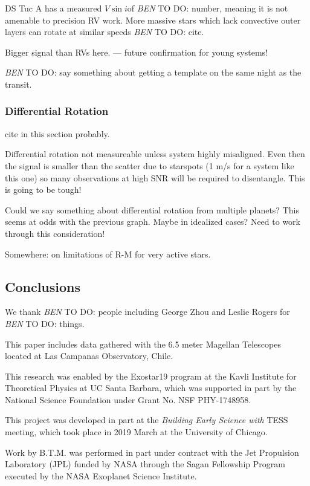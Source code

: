 \documentclass[twocolumn]{aastex63}
\newcommand{\vsini}{{$V \sin i$}}
\newcommand{\todo}[3]{{\color{#2} \emph{#1} TO DO: #3}}
\newcommand{\btmtodo}[1]{\todo{BEN}{blue}{#1}}
\begin{document}
DS Tuc A has a measured \vsini of \btmtodo{number}, meaning it is not amenable to precision RV work.
More massive stars which lack convective outer layers can rotate at similar speeds \btmtodo{cite}.

Bigger signal than RVs here. --- future confirmation for young systems!


\btmtodo{say something about getting a template on the same night as the transit.}

\subsubsection{Differential Rotation}



cite \citet{Giminez06} in this section probably.


Differential rotation not measureable unless system highly misaligned. Even then the signal is smaller than the scatter due to starspots (1 m/s for a system like this one) so many observations at high SNR will be required to disentangle. This is going to be tough!

Could we say something about differential rotation from multiple planets? This seems at odds with the previous graph. Maybe in idealized cases? Need to work through this consideration!


Somewhere: \citet{Oshagh18} on limitations of R-M for very active stars.


\subsection{Conclusions}



\acknowledgements

We thank \btmtodo{people including George Zhou and Leslie Rogers} for \btmtodo{things}.

This paper includes data gathered with the 6.5 meter Magellan Telescopes located at Las Campanas Observatory, Chile.


This research was enabled by the Exostar19 program at the Kavli Institute for Theoretical Physics at UC Santa Barbara, which was supported in part by the National Science Foundation under Grant No. NSF PHY-1748958.

This project was developed in part at the \textit{Building Early Science with} TESS meeting, which took place in 2019 March at the University of Chicago.

Work by B.T.M. was performed in part under contract with the Jet
Propulsion Laboratory (JPL) funded by NASA through
the Sagan Fellowship Program executed by the NASA
Exoplanet Science Institute.
\end{document}
